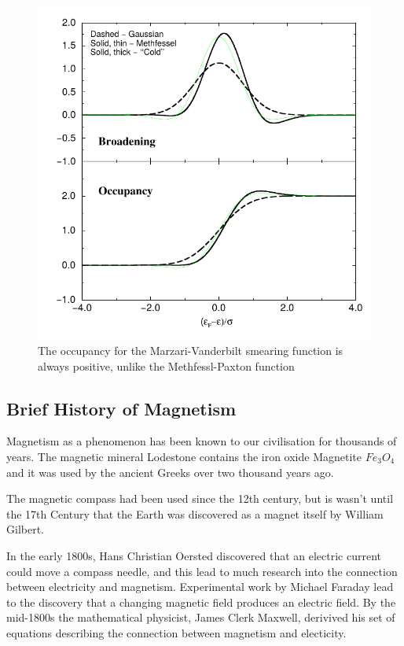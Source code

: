 \begin{figure}
\centering
\begin{minipage}{.65\textwidth}
\centering
    \includegraphics[width=.6\linewidth]{chapters/background_potential_fitting/images/marzarismearing.png}
    \caption{The occupancy for the Marzari-Vanderbilt smearing function is always positive, unlike the Methfessl-Paxton function\cite{marzarithesis2}}
    \label{fig:marzarimethfessel}
\end{minipage}
\end{figure}






\subsection{Brief History of Magnetism}

Magnetism as a phenomenon has been known to our civilisation for thousands of years.  The magnetic mineral Lodestone contains the iron oxide Magnetite $Fe_3 O_4$ and it was used by the ancient Greeks over two thousand years ago.

The magnetic compass had been used since the 12th century, but is wasn't until the 17th Century that the Earth was discovered as a magnet itself by William Gilbert.

In the early 1800s, Hans Christian Oersted discovered that an electric current could move a compass needle, and this lead to much research into the connection between electricity and magnetism.  Experimental work by Michael Faraday lead to the discovery that a changing magnetic field produces an electric field.  By the mid-1800s the mathematical physicist, James Clerk Maxwell, derivived his set of equations describing the connection between magnetism and electicity. 

